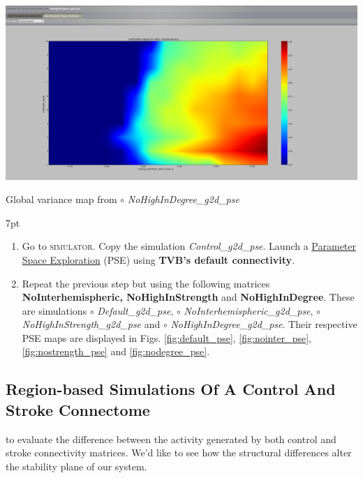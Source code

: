 \documentclass{tufte-handout}
\newenvironment{simulation}{%
  \def\FrameCommand{%
    \hspace{1pt}%
    {\color{ForestGreen}\vrule width 2pt}%
    {\color{simulationshade}\vrule width 4pt}%
    \colorbox{simulationshade}%
  }%
  \MakeFramed{\advance\hsize-\width\FrameRestore}%
  \noindent\hspace{-4.55pt}%
  \begin{adjustwidth}{}{7pt}%
  \vspace{2pt}\vspace{2pt}%
}
{%
  \vspace{2pt}\end{adjustwidth}\endMakeFramed%
}
\begin{document}
 \begin{marginfigure}%
  \includegraphics[width=\linewidth]{Handout_UI_ModellingStructuralLesions_NoHighInDegreePSE}
    \caption{Global variance map from $\circ$  \textit{NoHighInDegree\_g2d\_pse}}
  \label{fig:nodegree_pse}
  \end{marginfigure}
  
\begin{simulation}
\begin{enumerate}
\item Go to \textsc{simulator}. Copy the simulation \textit{Control\_g2d\_pse}.  Launch a \underline{Parameter Space Exploration} (PSE) using \textbf{TVB's default connectivity}.
\item Repeat the previous step but using the following matrices \textbf{NoInterhemispheric, NoHighInStrength} and \textbf{NoHighInDegree}.
These are simulations $\circ$  \textit{Default\_g2d\_pse}, $\circ$ \textit{NoInterhemispheric\_g2d\_pse}, $\circ$ \textit{NoHighInStrength\_g2d\_pse} and $\circ$ \textit{NoHighInDegree\_g2d\_pse}. Their respective PSE maps are displayed in Figs. \ref{fig:default_pse}, \ref{fig:nointer_pse}, \ref{fig:nostrength_pse} and \ref{fig:nodegree_pse}.
\end{enumerate}
\end{simulation}



\subsection{Region-based Simulations Of A Control And Stroke Connectome}

 to evaluate the difference between the activity generated by both control and stroke connectivity matrices. We'd like to see how the structural differences alter the stability plane of our system. 
\end{document}
